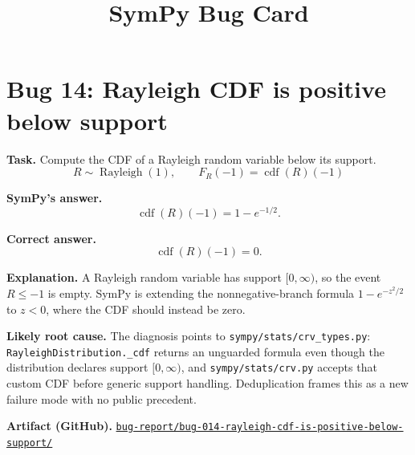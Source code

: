 \documentclass[11pt]{article}
\title{SymPy Bug Card}
\author{}
\date{}
\newcommand{\SymPy}{SymPy}
\newcommand{\artifactrepo}{https://github.com/TODO-org/TODO-repo}
\newcommand{\bugbundle}[1]{\href{\artifactrepo/tree/main/bug-report/#1}{\nolinkurl{bug-report/#1/}}}
\begin{document}
\maketitle

\section*{Bug 14: Rayleigh CDF is positive below support}

\begin{counterexamplebox}
\textbf{Task.} Compute the CDF of a Rayleigh random variable below its support.
\[
R\sim\operatorname{Rayleigh}(1),\qquad F_R(-1)=\operatorname{cdf}(R)(-1)
\]

\medskip
\textbf{SymPy's answer.}
\[
\operatorname{cdf}(R)(-1)=1-e^{-1/2}.
\]

\medskip
\textbf{Correct answer.}
\[
\operatorname{cdf}(R)(-1)=0.
\]

\medskip
\textbf{Explanation.} A Rayleigh random variable has support \([0,\infty)\), so
the event \(R\leq -1\) is empty.  \SymPy{} is extending the nonnegative-branch
formula \(1-e^{-z^2/2}\) to \(z<0\), where the CDF should instead be zero.

\medskip
\textbf{Likely root cause.} The diagnosis points to
\nolinkurl{sympy/stats/crv_types.py}: \texttt{RayleighDistribution.\_cdf}
returns an unguarded formula even though the distribution declares support
\([0,\infty)\), and \nolinkurl{sympy/stats/crv.py} accepts that custom CDF
before generic support handling.  Deduplication frames this as a new failure
mode with no public precedent.

\medskip
\textbf{Artifact (GitHub).} \bugbundle{bug-014-rayleigh-cdf-is-positive-below-support}
\end{counterexamplebox}
\end{document}
